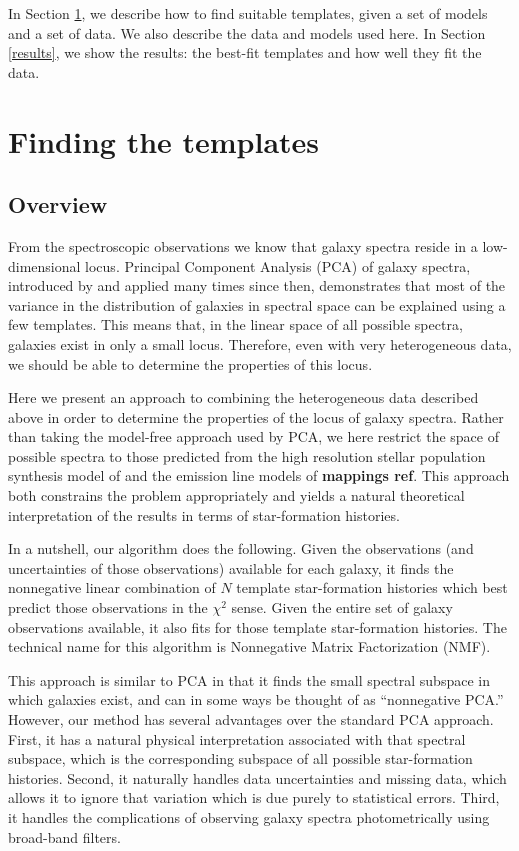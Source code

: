 \documentclass[10pt,preprint]{aastex}
\begin{document}
In Section \ref{algorithm}, we describe how to find suitable
templates, given a set of models and a set of data. We also describe
the data and models used here. In Section \ref{results}, we show the
results: the best-fit templates and how well they fit the data. 


\section{Finding the templates}
\label{algorithm}

\subsection{Overview}

From the spectroscopic observations we know that galaxy spectra reside
in a low-dimensional locus. Principal Component Analysis (PCA) of
galaxy spectra, introduced by \citet{connolly95b} and applied many
times since then, demonstrates that most of the variance in the
distribution of galaxies in spectral space can be explained using a
few templates. This means that, in the linear space of all possible
spectra, galaxies exist in only a small locus. Therefore, even with
very heterogeneous data, we should be able to determine the properties
of this locus.

Here we present an approach to combining the heterogeneous data
described above in order to determine the properties of the locus of
galaxy spectra. Rather than taking the model-free approach used by
PCA, we here restrict the space of possible spectra to those predicted
from the high resolution stellar population synthesis model of
\citet{bruzual03a} and the emission line models of {\bf mappings
ref}.  This approach both constrains the problem appropriately and
yields a natural theoretical interpretation of the results in terms of
star-formation histories.

In a nutshell, our algorithm does the following. Given the
observations (and uncertainties of those observations) available for
each galaxy, it finds the nonnegative linear combination of $N$
template star-formation histories which best predict those
observations in the $\chi^2$ sense. Given the entire set of galaxy
observations available, it also fits for those template star-formation
histories. The technical name for this algorithm is Nonnegative Matrix
Factorization (NMF).

This approach is similar to PCA in that it finds the small spectral
subspace in which galaxies exist, and can in some ways be thought of
as ``nonnegative PCA.''  However, our method has several advantages
over the standard PCA approach. First, it has a natural physical
interpretation associated with that spectral subspace, which is the
corresponding subspace of all possible star-formation
histories. Second, it naturally handles data uncertainties and missing
data, which allows it to ignore that variation which is due purely to
statistical errors.  Third, it handles the complications of observing
galaxy spectra photometrically using broad-band filters.
\end{document}
